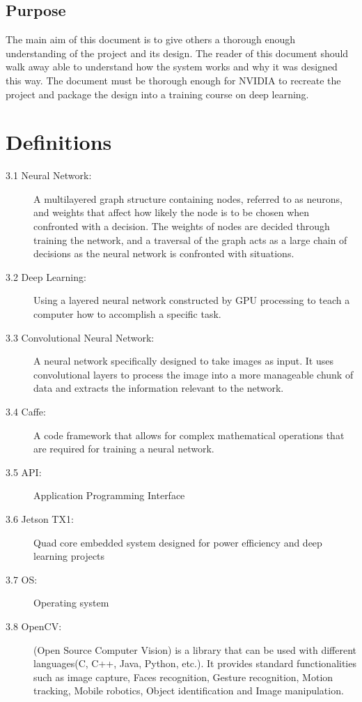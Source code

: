\documentclass{scrreprt}
\begin{document}
\section{Purpose}

The main aim of this document is to give others a thorough enough understanding of the project and its design.
The reader of this document should walk away able to understand how the system works and why it was designed this way.
The document must be thorough enough for NVIDIA to recreate the project and package the design into a training course on deep learning.


\chapter{Definitions}
\begin{description}

  \item[3.1 Neural Network:] A multilayered graph structure containing nodes, referred to as neurons, and weights that affect how likely the node is to be chosen when confronted with a decision. The weights of nodes are decided through training the network, and a traversal of the graph acts as a large chain of decisions as the neural network is confronted with situations.

  \item[3.2 Deep Learning:]  Using a layered neural network constructed by GPU processing to teach a computer how to accomplish a specific task.

  \item[3.3 Convolutional Neural Network:] A neural network specifically designed to take images as input. It uses convolutional layers to process the image into a more manageable chunk of data and extracts the information relevant to the network.

  \item[3.4 Caffe:] A code framework that allows for complex mathematical operations that are required for training a neural network.

  \item[3.5 API:] Application Programming Interface

  \item[3.6 Jetson TX1:] Quad core embedded system designed for power efficiency and deep learning projects

  \item[3.7 OS:] Operating system

  \item[3.8 OpenCV:] (Open Source Computer Vision) is a library that can be used with different languages(C, C++, Java, Python, etc.). It provides standard functionalities such as image capture, Faces recognition, Gesture recognition, Motion tracking, Mobile robotics, Object identification and Image manipulation.

\end{description}
\end{document}
